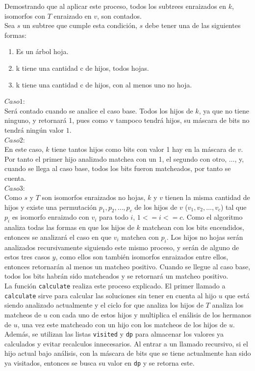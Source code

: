 \documentclass[a4paper,12pt,twocolumn]{article}
\begin{document}
		Demostrando que al aplicar este proceso, todos los subtrees enraizados en $k$, isomorfos con $T$ enraizado en $v$, son contados.\\
		
		Sea $s$ un subtree que cumple esta condición, $s$ debe tener una de las siguientes formas:\\
		\begin{enumerate}
			\item Es un árbol hoja. 
			\item k tiene una cantidad c de hijos, todos hojas.
			\item k tiene una cantidad c de hijos, con al menos uno no hoja.
		\end{enumerate} 
		
		$Caso 1$:\\ Será contado cuando se analice el caso base. Todos los hijos de $k$, ya que no tiene ninguno, y retornará 1, pues como v tampoco tendrá hijos, su máscara de bits no tendrá ningún valor $1$.\\
		
		$Caso 2$:\\ En este caso, $k$ tiene tantos hijos como bits con valor 1 hay en la máscara de $v$. Por tanto el primer hijo analizado matchea con un 1, el segundo con otro, $…$, y, cuando se llega al caso base, todos los bits fueron matcheados, por tanto se cuenta.\\
		
		$Caso 3$:\\ Como $s$ y $T$ son isomorfos enraizados no hojas, $k$ y $v$ tienen la misma cantidad de hijos y existe una permutación $p_1, p_2, … , p_c$ de los hijos de $v$ ($ v_1, v_2, … , v_c $) tal que $p_i$ es isomorfo enraizado con $v_i$ para todo $i$, $1 <= i <= c$. Como el algoritmo analiza todas las formas en que los hijos de $k$ matchean con los bits encendidos, entonces se analizará el caso en que $v_i$ matchea con $p_i$. Los hijos no hojas serán analizados recursivamente siguiendo este mismo proceso, y serán de alguno de estos tres casos $y$, como ellos son también isomorfos enraizados entre ellos, entonces retornarán al menos un matcheo positivo. Cuando se llegue al caso base, todos los bits habrán sido matcheados y se retornará un matcheo positivo.\\
		
		
		La función \texttt{\ttfamily calculate} realiza este proceso explicado. El primer llamado a \texttt{\ttfamily calculate} sirve para calcular las soluciones sin tener en cuenta al hijo $u$ que está siendo analizado actualmente y el ciclo for que analiza los hijos de $T$ analiza los matcheos de $u$ con cada uno de estos hijos y multiplica el enálisis de los hermanos de $u$, una vez este matcheado con un hijo con los matcheos de los hijos de $u$. Además, se utilizan las listas \texttt{\ttfamily visited} y \texttt{\ttfamily dp} para almacenar los valores ya calculados y evitar recalculos innecesarios. Al entrar a un llamado recursivo, si el hijo actual bajo análisis, con la máscara de bits que se tiene actualmente han sido ya visitados, entonces se busca su valor en \texttt{\ttfamily dp} y se retorna este.\\
		
\end{document}
